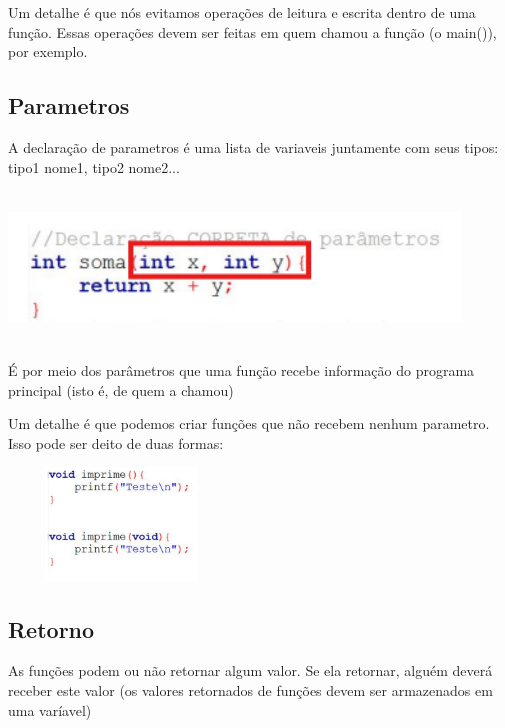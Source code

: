 \documentclass{report}
\begin{document}
	Um detalhe é que nós evitamos operações de leitura e escrita dentro de uma função. Essas operações devem ser feitas em quem chamou a função (o main()), por exemplo.
	
	\subsection{Parametros}
	
	A declaração de parametros é uma lista de variaveis juntamente com seus tipos: tipo1 nome1, tipo2 nome2...
	
	\begin{center}
		
		\includegraphics[width=12cm,height=4cm,keepaspectratio=false]{imagens/parametros.png}
		
	\end{center}
	
	É por meio dos parâmetros que uma função recebe informação do programa principal (isto é, de quem a chamou)
	
	Um detalhe é que podemos criar funções que não recebem nenhum parametro. Isso pode ser deito de duas formas:
	
	\begin{center}
		
		\includegraphics[width=6cm,height=3cm,keepaspectratio=false]{imagens/parametros2.png}
		
	\end{center}
	
	
	
	\subsection{Retorno}
	
	As funções podem ou não retornar algum valor. Se ela retornar, alguém deverá receber este valor (os valores retornados de funções devem ser armazenados em uma varíavel)
	
\end{document}
